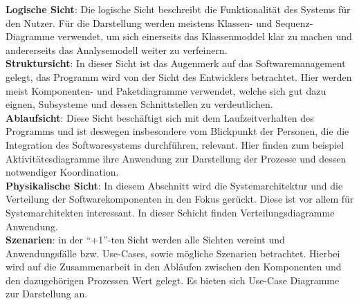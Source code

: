 \textbf{Logische Sicht}: Die logische Sicht beschreibt die Funktionalität des Systems für den Nutzer. Für die Darstellung werden meistens Klassen- und Sequenz-Diagramme verwendet, um
sich einerseits das Klassenmoddel klar zu machen und andererseits das Analysemodell weiter zu verfeinern.\\
 
\textbf{Struktursicht}: In dieser Sicht ist das Augenmerk auf das Softwaremanagement gelegt, das Programm wird von der Sicht des Entwicklers betrachtet. Hier werden meist Komponenten-
und Paketdiagramme verwendet, welche sich gut dazu eignen, Subsysteme und dessen Schnittstellen zu verdeutlichen.\\
 
\textbf{Ablaufsicht}: Diese Sicht beschäftigt sich mit dem Laufzeitverhalten des Programms und ist deswegen insbesondere vom Blickpunkt der Personen, die die Integration des Softwaresystems
durchführen, relevant. Hier finden zum beispiel Aktivitätesdiagramme ihre Anwendung zur Darstellung der Prozesse und dessen notwendiger Koordination.\\
 
\textbf{Physikalische Sicht}: In diesem Abschnitt wird die Systemarchitektur und die Verteilung der Softwarekomponenten in den Fokus gerückt. Diese ist vor allem für Systemarchitekten interessant.
In dieser Schicht finden Verteilungsdiagramme Anwendung. \\

\textbf{Szenarien}: in der ``+1''-ten Sicht werden alle Sichten vereint und Anwendungsfälle bzw. Use-Cases, sowie mögliche Szenarien betrachtet.
Hierbei wird auf die Zusammenarbeit in den Abläufen zwischen den Komponenten und den dazugehörigen Prozessen Wert gelegt. Es bieten sich Use-Case Diagramme zur Darstellung an.\\

